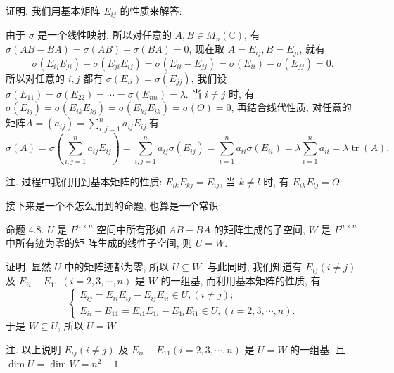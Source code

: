 \documentclass{article}
\begin{document}
\vspace{1ex}
{\heiti 证明.} 我们用基本矩阵 $E_{i j}$ 的性质来解答:

由于 $\sigma$ 是一个线性映射, 所以对任意的 $A, B \in M_{n}(\mathbb{C})$, 有 $\sigma(A B-B A)=\sigma(A B)-\sigma(B A)=0$, 现在取
$A=E_{i j}, B=E_{j i}$, 就有
\begin{equation*}
    \sigma\left(E_{i j} E_{j i}\right)-\sigma\left(E_{j i} E_{i j}\right)=\sigma\left(E_{i i}-E_{j j}\right)=\sigma\left(E_{i i}\right)-\sigma\left(E_{j j}\right)=0 .
\end{equation*}
所以对任意的 $i, j$ 都有 $\sigma\left(E_{i i}\right)=\sigma\left(E_{j j}\right)$, 我们设 $\sigma\left(E_{11}\right)=\sigma\left(E_{22}\right)=\cdots=\sigma\left(E_{n n}\right)=\lambda .$
当 $i \neq j$ 时, 有 $\sigma\left(E_{i j}\right)=\sigma\left(E_{i k} E_{k j}\right)=\sigma\left(E_{k j} E_{i k}\right)=\sigma(O)=0$, 再结合线代性质, 对任意的矩阵$A=\left(a_{i j}\right)=\sum_{i, j=1}^{n} a_{i j} E_{i j}$,有
\begin{equation*}
    \sigma(A)=\sigma\left(\sum_{i, j=1}^{n} a_{i j} E_{i j}\right)=\sum_{i, j=1}^{n} a_{i j} \sigma\left(E_{i j}\right)=\sum_{i=1}^{n} a_{i i} \sigma\left(E_{i i}\right)=\lambda \sum_{i=1}^{n} a_{i i}=\lambda \operatorname{tr}(A).
\end{equation*}

{\heiti 注.} 过程中我们用到基本矩阵的性质: $E_{i k} E_{k j}=E_{i j}$, 当 $k \neq l$ 时, 有 $E_{i k} E_{l j}=O .$

接下来是一个不怎么用到的命题, 也算是一个常识:

{\heiti 命题 4.8.} {\kaishu $U$ 是 $P^{n \times n}$ 空间中所有形如 $A B-B A$ 的矩阵生成的子空间, $W$ 是 $P^{n \times n}$ 中所有迹为零的矩
阵生成的线性子空间, 则 $U=W$.}

{\heiti 证明.} 显然 $U$ 中的矩阵迹都为零, 所以 $U \subseteq W .$ 与此同时, 我们知道有 $E_{i j}(i \neq j)$ 及 $E_{i i}-E_{11}$ $(i=2,3, \cdots, n)$ 是 $W$ 的一组基, 而利用基本矩阵的性质, 有
\begin{equation*}
    \left\{\begin{array}{l}
        E_{i j}=E_{i i} E_{i j}-E_{i j} E_{i i} \in U,(i \neq j) ; \\
        E_{i i}-E_{11}=E_{i 1} E_{1 i}-E_{1 i} E_{i 1} \in U,(i=2,3, \cdots, n).
    \end{array}\right.
\end{equation*}
于是 $W \subseteq U$, 所以 $U=W$.

    {\heiti 注.} 以上说明 $E_{i j}(i \neq j)$ 及 $E_{i i}-E_{11}(i=2,3, \cdots, n)$ 是 $U=W$ 的一组基, 且 $\operatorname{dim} U=\operatorname{dim} W=n^{2}-1$.
\end{document}
